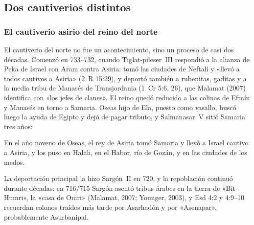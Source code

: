 \subsection{Dos cautiverios distintos}\label{sec:doscautiverios}

\subsubsection*{El cautiverio asirio del reino del norte}
El cautiverio del norte no fue un acontecimiento, sino un proceso de casi dos décadas. Comenzó en 733--732, cuando Tiglat-pileser~III respondió a la alianza de Peka de Israel con Aram contra Asiria: tomó las ciudades de Neftalí y «llevó a todos cautivos a Asiria» (2~R 15:29), y deportó también a rubenitas, gaditas y a la media tribu de Manasés de Transjordania (1~Cr 5:6, 26), que Malamat (2007) identifica con «los jefes de clanes». El reino quedó reducido a las colinas de Efraín y Manasés en torno a Samaria. Oseas hijo de Ela, puesto como vasallo, buscó luego la ayuda de Egipto y dejó de pagar tributo, y Salmanasar~V sitió Samaria tres años:
\begin{cita}En el año noveno de Oseas, el rey de Asiria tomó Samaria y llevó a Israel cautivo a Asiria, y los puso en Halah, en el Habor, río de Gozán, y en las ciudades de los medos.\end{cita}
La deportación principal la hizo Sargón~II en 720, y la repoblación continuó durante décadas: en 716/715 Sargón asentó tribus árabes en la tierra de «Bit-Humri», la «casa de Omri» (Malamat, 2007; Younger, 2003), y Esd 4:2 y 4:9--10 recuerdan colonos traídos más tarde por Asarhadón y por «Asenapar», probablemente Asurbanipal.

